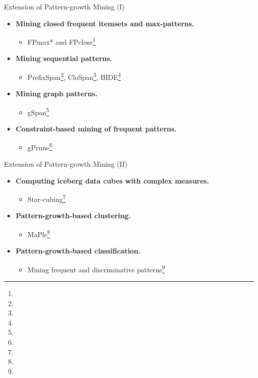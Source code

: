\begin{frame}{Extension of Pattern-growth Mining (I)}
	\begin{itemize}
		\item \textbf{Mining closed frequent itemsets and max-patterns.}
		      \begin{itemize}
			      \item FPmax* and FPclose\footnote{}
		      \end{itemize}
		\item \textbf{Mining sequential patterns.}
		      \begin{itemize}
			      \item PrefixSpan\footnote{}, CloSpan\footnote{}, BIDE\footnote{}
		      \end{itemize}
		\item \textbf{Mining graph patterns.}
		      \begin{itemize}
			      \item gSpan\footnote{}
		      \end{itemize}
		\item \textbf{Constraint-based mining of frequent patterns.}
		      \begin{itemize}
			      \item gPrune\footnote{}
		      \end{itemize}
	\end{itemize}
\end{frame}

\begin{frame}{Extension of Pattern-growth Mining (II)}
	\begin{itemize}
		\item \textbf{Computing iceberg data cubes with complex measures.}
		      \begin{itemize}
			      \item Star-cubing\footnote{}
		      \end{itemize}
		\item \textbf{Pattern-growth-based clustering.}
		      \begin{itemize}
			      \item MaPle\footnote{}
		      \end{itemize}
		\item \textbf{Pattern-growth-based classification.}
		      \begin{itemize}
			      \item Mining frequent and discriminative patterns\footnote{}
		      \end{itemize}
	\end{itemize}
\end{frame}

